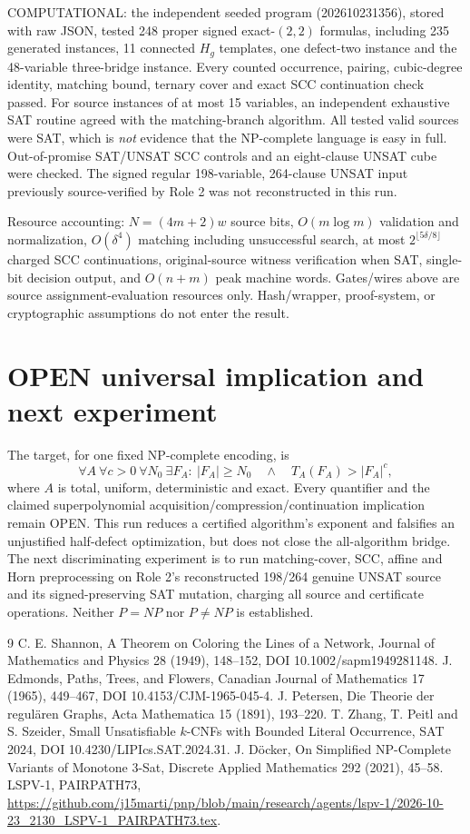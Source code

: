 \documentclass[11pt]{article}
\begin{document}
COMPUTATIONAL: the independent seeded program (202610231356), stored with raw JSON, tested 248 proper signed exact-$(2,2)$ formulas, including 235 generated instances, 11 connected $H_g$ templates, one defect-two instance and the 48-variable three-bridge instance. Every counted occurrence, pairing, cubic-degree identity, matching bound, ternary cover and exact SCC continuation check passed. For source instances of at most 15 variables, an independent exhaustive SAT routine agreed with the matching-branch algorithm. All tested valid sources were SAT, which is \emph{not} evidence that the NP-complete language is easy in full. Out-of-promise SAT/UNSAT SCC controls and an eight-clause UNSAT cube were checked. The signed regular 198-variable, 264-clause UNSAT input previously source-verified by Role 2 was not reconstructed in this run.

Resource accounting: $N=(4m+2)w$ source bits, $O(m\log m)$ validation and normalization, $O(\delta^4)$ matching including unsuccessful search, at most $2^{\lfloor5\delta/8\rfloor}$ charged SCC continuations, original-source witness verification when SAT, single-bit decision output, and $O(n+m)$ peak machine words. Gates/wires above are source assignment-evaluation resources only. Hash/wrapper, proof-system, or cryptographic assumptions do not enter the result.

\section{OPEN universal implication and next experiment}
The target, for one fixed NP-complete encoding, is
\[
\forall A\ \forall c>0\ \forall N_0\ \exists F_A:\ 
|F_A|\ge N_0\quad\land\quad T_A(F_A)>|F_A|^c,
\]
where $A$ is total, uniform, deterministic and exact. Every quantifier and the claimed superpolynomial acquisition/compression/continuation implication remain OPEN. This run reduces a certified algorithm's exponent and falsifies an unjustified half-defect optimization, but does not close the all-algorithm bridge. The next discriminating experiment is to run matching-cover, SCC, affine and Horn preprocessing on Role 2's reconstructed 198/264 genuine UNSAT source and its signed-preserving SAT mutation, charging all source and certificate operations. Neither $P=NP$ nor $P\ne NP$ is established.

\begin{thebibliography}{9}
 C. E. Shannon, A Theorem on Coloring the Lines of a Network, Journal of Mathematics and Physics 28 (1949), 148--152, DOI 10.1002/sapm1949281148.
\bibitem{Edmonds} J. Edmonds, Paths, Trees, and Flowers, Canadian Journal of Mathematics 17 (1965), 449--467, DOI 10.4153/CJM-1965-045-4.
\bibitem{Petersen} J. Petersen, Die Theorie der regul\"aren Graphs, Acta Mathematica 15 (1891), 193--220.
\bibitem{ZPS} T. Zhang, T. Peitl and S. Szeider, Small Unsatisfiable $k$-CNFs with Bounded Literal Occurrence, SAT 2024, DOI 10.4230/LIPIcs.SAT.2024.31.
\bibitem{Docker} J. D\"ocker, On Simplified NP-Complete Variants of Monotone 3-Sat, Discrete Applied Mathematics 292 (2021), 45--58.
\bibitem{PAIRPATH} LSPV-1, PAIRPATH73, \url{https://github.com/j15marti/pnp/blob/main/research/agents/lspv-1/2026-10-23_2130_LSPV-1_PAIRPATH73.tex}.
\end{thebibliography}
\end{document}
